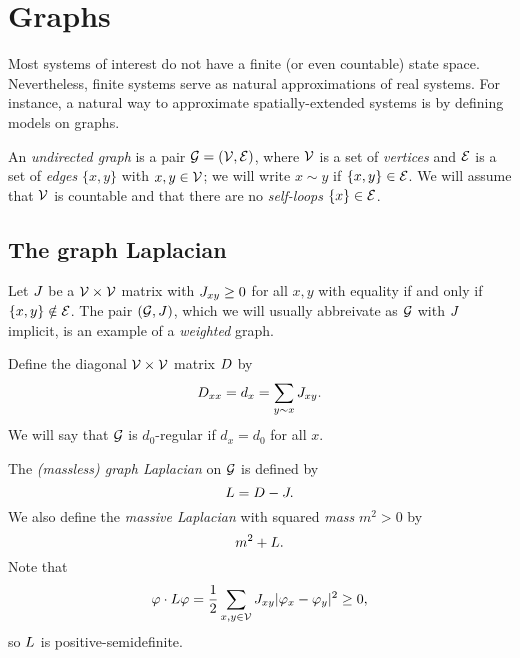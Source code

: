\section{Graphs}

Most systems of interest do not have a finite (or even countable) state space. Nevertheless, finite systems serve as natural approximations of real systems. For instance, a natural way to approximate spatially-extended systems is by defining models on graphs.

An \emph{undirected graph} is a pair $\mathcal{G} = (\mathcal{V}, \mathcal{E})$, where $\mathcal{V}$ is a set of \emph{vertices} and $\mathcal{E}$ is a set of
\emph{edges} $\{ x, y \}$ with $x, y \in \mathcal{V}$; we will write $x \sim y$ if $\{ x, y \} \in \mathcal{E}$. We will assume that $\mathcal{V}$ is countable and that there are no \emph{self-loops} $\{ x \} \in \mathcal{E}$.


\subsection{The graph Laplacian}

Let $J$ be a $\mathcal{V}\times\mathcal{V}$ matrix with $J_{xy} \ge 0$ for all $x, y$ with equality if and only if $\{ x, y \} \notin \mathcal{E}$. The pair
$(\mathcal{G}, J)$, which we will usually abbreivate as $\mathcal{G}$ with $J$ implicit, is an example of a \emph{weighted} graph.

Define the diagonal $\mathcal{V}\times\mathcal{V}$ matrix $D$ by
\begin{equation}
D_{xx} = d_x = \sum_{y \sim x} J_{xy}.
\end{equation}
We will say that $\mathcal{G}$ is $d_0$-regular if $d_x = d_0$ for all $x$.

The \emph{(massless) graph Laplacian} on $\mathcal{G}$ is defined by
\begin{equation}
L = D - J.
\end{equation}
We also define the \emph{massive Laplacian} with squared \emph{mass} $m^2 > 0$
by
\begin{equation}
m^2 + L.
\end{equation}
Note that
\begin{equation}
\varphi \cdot L \varphi
  =
\frac{1}{2} \sum_{x,y\in\mathcal{V}} J_{xy} |\varphi_x - \varphi_y|^2
  \ge
0,
\end{equation}
so $L$ is positive-semidefinite.

